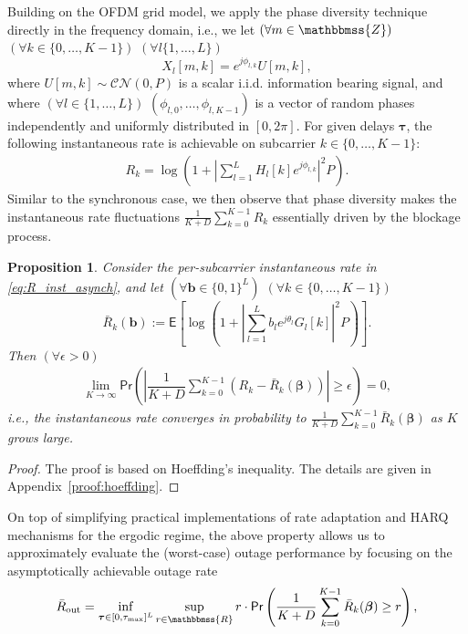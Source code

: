 \documentclass[10pt,journal,a4paper]{IEEEtran}
\newcommand{\eqdef}{:=}
\newcommand{\E}{\mathsf{E}}		%
\renewcommand{\P}{\mathsf{Pr}} 			%
\newcommand{\stdset}[1]{\mathbbmss{#1}}	%
\renewcommand{\vec}[1]{\bm{#1}}		%
\newcommand{\CN}{\mathcal{CN}}			%
\newtheorem{proposition}{Proposition}
\begin{document}
Building on the OFDM grid model, we apply the phase diversity technique directly in the frequency domain, i.e., we let $(\forall m \in \stdset{Z})$ $(\forall k\in \{0,\ldots,K-1\})$ $(\forall l \{1,\ldots,L\})$
\begin{equation*}
X_l[m,k] = e^{j\phi_{l,k}}U[m,k],
\end{equation*}
where $U[m,k]\sim \CN(0,P)$ is a scalar i.i.d. information bearing signal, and where $(\forall l \in\{1,\ldots,L\})$ $(\phi_{l,0},\ldots,\phi_{l,K-1})$ is a vector of random phases independently and uniformly distributed in $[0,2\pi]$. For given delays $\vec{\tau}$, the following instantaneous rate is achievable on subcarrier
$k\in \{0,\ldots,K-1\}$:
\begin{align}\label{eq:R_inst_asynch}
R_k= \log\left(1+\left|\sum_{l=1}^LH_l[k]e^{j\phi_{l,k}}\right|^2P\right).
\end{align}
Similar to the synchronous case, we then observe that phase diversity makes the instantaneous rate fluctuations $\frac{1}{K+D}\sum_{k=0}^{K-1}R_k$ essentially driven by the blockage process.
\begin{proposition}\label{prop:hoeffding}
Consider the per-subcarrier instantaneous rate in \eqref{eq:R_inst_asynch}, and let $(\forall \vec{b}\in \{0,1\}^L)$ $(\forall k \in \{0,\ldots,K-1\})$
\begin{equation*}
\bar{R}_k(\vec{b}) \eqdef \E\left[\log\left(1+\left|\textstyle\sum_{l=1}^Lb_le^{j\theta_l}G_l[k]\right|^2P\right)\right].
\end{equation*}
Then $(\forall \epsilon > 0)$
\begin{align*}
\lim_{K\to \infty}\P\left(\left|\dfrac{1}{K+D}\sum_{k=0}^{K-1}\left(R_k-\bar{R}_k(\vec{\beta})\right) \right|\geq \epsilon\right)=0,
\end{align*}
i.e., the instantaneous rate converges in probability to $\frac{1}{K+D}\sum_{k=0}^{K-1}\bar{R}_k(\vec{\beta})$ as $K$ grows large.
\end{proposition}
\begin{proof}
The proof is based on Hoeffding's inequality. The details are given in Appendix~\ref{proof:hoeffding}.
\end{proof}
On top of simplifying practical implementations of rate adaptation and HARQ mechanisms for the ergodic regime, the above property allows us to approximately evaluate the (worst-case) outage performance by focusing on the asymptotically achievable outage rate
\begin{equation}\label{eq:R_out_worstcase_def}
\bar{R}_{\mathrm{out}}= \inf_{\vec{\tau}\in[0,\tau_{\max}]^L} \sup_{r\in \stdset{R}} r\cdot\P\left(\dfrac{1}{K+D}\sum_{k=0}^{K-1}\bar{R}_k(\vec{\beta})\geq r\right),
\end{equation}
\end{document}
